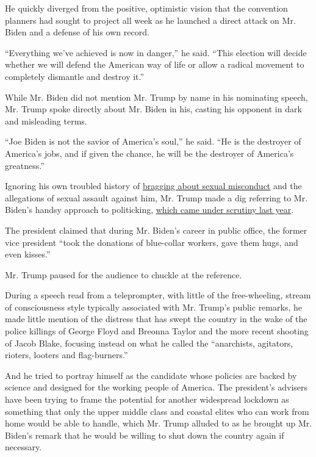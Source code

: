 He quickly diverged from the positive, optimistic vision that the
convention planners had sought to project all week as he launched a
direct attack on Mr. Biden and a defense of his own record.

``Everything we've achieved is now in danger,'' he said. ``This election
will decide whether we will defend the American way of life or allow a
radical movement to completely dismantle and destroy it.''

While Mr. Biden did not mention Mr. Trump by name in his nominating
speech, Mr. Trump spoke directly about Mr. Biden in his, casting his
opponent in dark and misleading terms.

``Joe Biden is not the savior of America's soul,'' he said. ``He is the
destroyer of America's jobs, and if given the chance, he will be the
destroyer of America's greatness.''

Ignoring his own troubled history of
\href{https://www.nytimes3xbfgragh.onion/2016/10/08/us/donald-trump-tape-transcript.html?module=inline}{bragging
about sexual misconduct} and the allegations of sexual assault against
him, Mr. Trump made a dig referring to Mr. Biden's handsy approach to
politicking,
\href{https://www.nytimes3xbfgragh.onion/2019/04/02/us/politics/joe-biden-women-me-too.html}{which
came under scrutiny last year}.

The president claimed that during Mr. Biden's career in public office,
the former vice president ``took the donations of blue-collar workers,
gave them hugs, and even kisses.''

Mr. Trump paused for the audience to chuckle at the reference.

During a speech read from a teleprompter, with little of the
free-wheeling, stream of consciousness style typically associated with
Mr. Trump's public remarks, he made little mention of the distress that
has swept the country in the wake of the police killings of George Floyd
and Breonna Taylor and the more recent shooting of Jacob Blake, focusing
instead on what he called the ``anarchists, agitators, rioters, looters
and flag-burners.''

And he tried to portray himself as the candidate whose policies are
backed by science and designed for the working people of America. The
president's advisers have been trying to frame the potential for another
widespread lockdown as something that only the upper middle class and
coastal elites who can work from home would be able to handle, which Mr.
Trump alluded to as he brought up Mr. Biden's remark that he would be
willing to shut down the country again if necessary.

